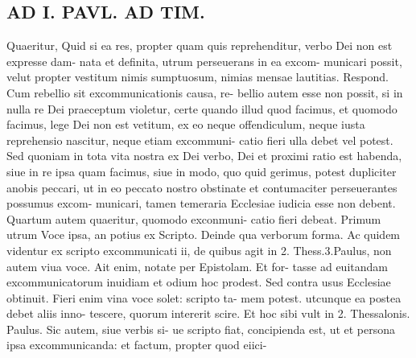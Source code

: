 \documentclass{article}
\begin{document}
\begin{pages}
\section*{AD I. PAVL. AD TIM. }
\marginpar{[ p.MB. ]}Quaeritur, Quid si ea res, propter quam quis reprehenditur, verbo Dei non est expresse dam- nata et definita, utrum perseuerans in ea excom- municari possit, velut propter vestitum nimis sumptuosum, nimias mensae lautitias. Respond. Cum rebellio sit excommunicationis causa, re- bellio autem esse non possit, si in nulla re Dei praeceptum violetur, certe quando illud quod facimus, et quomodo facimus, lege Dei non est vetitum, ex eo neque offendiculum, neque iusta reprehensio nascitur, neque etiam excommuni- catio fieri ulla debet vel potest. Sed quoniam in tota vita nostra ex Dei verbo, Dei et proximi ratio est habenda, siue in re ipsa quam facimus, siue in modo, quo quid gerimus, potest dupliciter anobis peccari, ut in eo peccato nostro obstinate et contumaciter perseuerantes possumus excom- municari, tamen temeraria Ecclesiae iudicia esse non debent. Quartum autem quaeritur, quomodo exconmuni- catio fieri debeat. Primum utrum Voce ipsa, an potius ex Scripto. Deinde qua verborum forma. Ac quidem videntur ex scripto excommunicati ii, de quibus agit in 2. Thess.3.Paulus, non autem viua voce. Ait enim, notate per Epistolam. Et for- tasse ad euitandam excommunicatorum inuidiam et odium hoc prodest. Sed contra usus Ecclesiae obtinuit. Fieri enim vina voce solet: scripto ta- mem potest. utcunque ea postea debet aliis inno- tescere, quorum intererit scire. Et hoc sibi vult in 2. Thessalonis. Paulus. Sic autem, siue verbis si- ue scripto fiat, concipienda est, ut et persona ipsa excommunicanda: et factum, propter quod eiici- 

\end{pages}
\end{document}
